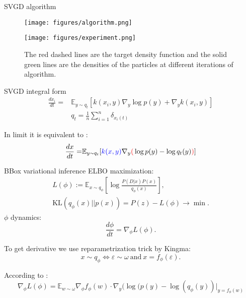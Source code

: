 \documentclass{beamer}
\begin{document}
\begin{frame}{SVGD algorithm}
    \begin{figure}
        \centering
        \texttt{[image: figures/algorithm.png]}
    \end{figure}
    \begin{figure}
        \centering
        \texttt{[image: figures/experiment.png]}
        \caption{The red dashed lines are the target density function
and the solid green lines are the densities of the particles at different iterations of algorithm.}
        \label{fig:enter-label}
    \end{figure}
    
\end{frame}

\begin{frame}{SVGD integral form}
    \begin{align}
        \frac{dx_i}{dt} = &\mathbb{E}_{y \sim q_t} [k(x_i, y) \nabla_y\log p(y) + \nabla_y k(x_i, y)] \\
        &q_t = \frac{1}{n}\sum^n_{i=1} \delta_{x_i(t)}
    \end{align}

In limit it is equivalent to \cite{lu2019scaling}:
    \begin{align}
        \frac{dx}{dt} = &\mathbb{E}_{y \sim q_t} [{\color{blue} k(x, y)} \nabla_y {\color{red}(} \log p(y) - \log q_t(y) {\color{red})}] \\
    \end{align}

\end{frame}

\begin{frame}{BBox variational inference}
 ELBO maximization:
 \begin{align}
     L(\phi) :=\mathbb{E}_{x \sim q_\phi} \left[ \log\frac{P(D|x)P(x)}{q_\phi(x)}\right], \\
     \text{KL}(q_{\phi}(x)|| p(x)) = P(z) - L(\phi) \rightarrow \min.
 \end{align}
$\phi$ dynamics:
\begin{equation}
    \frac{d\phi}{dt} = \nabla_{\phi}L(\phi).
\end{equation}

 To get derivative we use reparametrization trick by Kingma:
\begin{equation}
    x \sim q_{\phi} \Longleftrightarrow \varepsilon \sim \omega ~\text{and}~ x = f_{\phi}(\varepsilon).
\end{equation}

According to \cite{liu2016kernelized}:
\begin{equation}
    \nabla_{\phi}L(\phi) = \mathbb{E}_{w \sim \omega} \nabla_\phi f_\phi(w)\cdot \nabla_y
    (\log(p(y) - \log(q_\phi(y))|_{y = f_\phi(w)}
\end{equation}
\end{frame}
\end{document}
